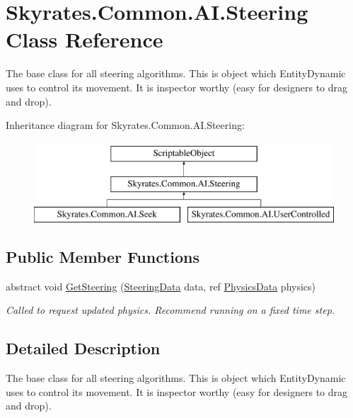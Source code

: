 \hypertarget{class_skyrates_1_1_common_1_1_a_i_1_1_steering}{\section{Skyrates.\-Common.\-A\-I.\-Steering Class Reference}
\label{class_skyrates_1_1_common_1_1_a_i_1_1_steering}
}


The base class for all steering algorithms. This is object which Entity\-Dynamic uses to control its movement. It is inspector worthy (easy for designers to drag and drop).  


Inheritance diagram for Skyrates.\-Common.\-A\-I.\-Steering\-:\begin{figure}[H]
\begin{center}
\leavevmode
\includegraphics[height=3.000000cm]{class_skyrates_1_1_common_1_1_a_i_1_1_steering}
\end{center}
\end{figure}
\subsection*{Public Member Functions}
\begin{DoxyCompactItemize}
\item 
abstract void \hyperlink{class_skyrates_1_1_common_1_1_a_i_1_1_steering_a6ed9adbbc920bf10006fe27ae9764045}{Get\-Steering} (\hyperlink{class_skyrates_1_1_common_1_1_a_i_1_1_steering_data}{Steering\-Data} data, ref \hyperlink{class_skyrates_1_1_common_1_1_a_i_1_1_physics_data}{Physics\-Data} physics)
\begin{DoxyCompactList}\small\item\em Called to request updated physics. Recommend running on a fixed time step. \end{DoxyCompactList}\end{DoxyCompactItemize}


\subsection{Detailed Description}
The base class for all steering algorithms. This is object which Entity\-Dynamic uses to control its movement. It is inspector worthy (easy for designers to drag and drop). 



